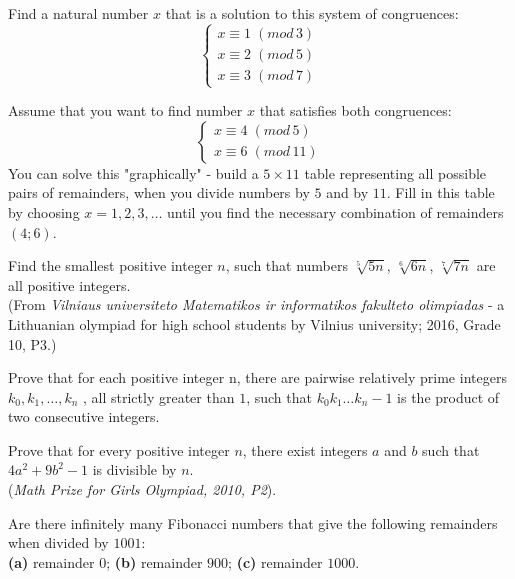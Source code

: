 \documentclass[jou]{apa6}
\begin{document}
\begin{problem} 
Find a natural number $x$ that is a solution to this system of congruences:
$$\left\{ \begin{array}{l}
x \equiv 1\;(\mathit{mod}\,3)\\
x \equiv 2\;(\mathit{mod}\,5)\\
x \equiv 3\;(\mathit{mod}\,7)
\end{array} \right.$$
\end{problem}


\begin{problem} 
Assume that you want to find number $x$ that satisfies both congruences:
$$\left\{ \begin{array}{l}
x \equiv 4\;(\mathit{mod}\,5)\\
x \equiv 6\;(\mathit{mod}\,11)
\end{array} \right.$$
You can solve this "graphically" - build a $5 \times 11$ table representing
all possible pairs of remainders, when you divide numbers by $5$ and by $11$. 
Fill in this table by choosing $x=1,2,3,\ldots$ until you find the necessary 
combination of remainders $(4;6)$. 
\end{problem}

\begin{problem} 
Find the smallest positive integer $n$, such that 
numbers $\sqrt[5]{5n}$, $\sqrt[6]{6n}$, $\sqrt[7]{7n}$ are all positive integers.\\
(From {\em Vilniaus universiteto Matematikos ir informatikos fakulteto olimpiadas} - 
a Lithuanian olympiad for high school students by Vilnius university; 2016, 
Grade 10, P3.)
\end{problem}

\begin{problem} 
Prove that for each positive integer n, there are pairwise relatively prime integers
$k_0, k_1, \ldots, k_n$ , all strictly greater than $1$, 
such that $k_0 k_1 \ldots k_n - 1$ is the product of
two consecutive integers.
\end{problem}

\begin{problem} 
Prove that for every positive integer $n$, there exist integers $a$ and $b$ such that $4a^2 + 9b^2 - 1$ is divisible by $n$.\\
({\em Math Prize for Girls Olympiad, 2010, P2}). 
\end{problem}

\begin{problem}
Are there infinitely many Fibonacci numbers that give the following remainders when divided by $1001$:\\
{\bf (a)} remainder $0$; {\bf (b)} remainder $900$; {\bf (c)} remainder $1000$.
\end{problem}
\end{document}
